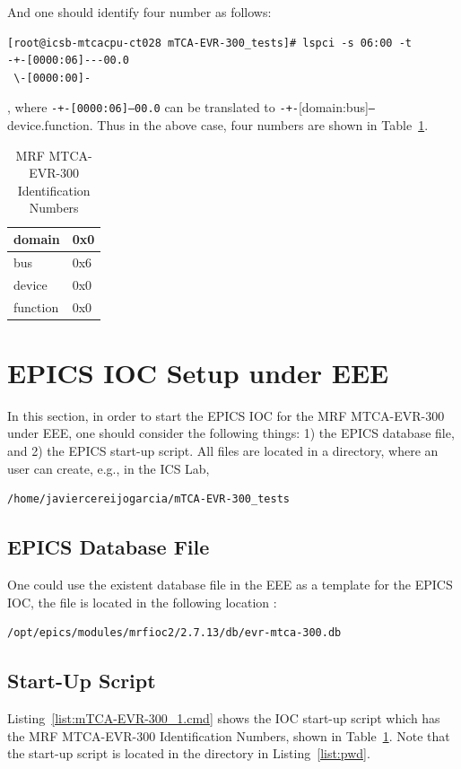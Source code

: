\documentclass[11pt
  , a4paper
  , article
  , oneside
  , showtrims
]{memoir}
\begin{document}
And one should identify four number as follows:
\begin{lstlisting}[style=termstyle]
[root@icsb-mtcacpu-ct028 mTCA-EVR-300_tests]# lspci -s 06:00 -t
-+-[0000:06]---00.0
 \-[0000:00]-
\end{lstlisting}
, where \texttt{-+-[0000:06]---00.0} can be translated to \texttt{-+-}[domain:bus]\texttt{---}device.function. Thus in the above case, four numbers are shown in Table~\ref{table:pciidnumber}.\begin{table}[!htb]
  \centering
  \begin{tabular}{l|l}
    \toprule
    domain   & 0x0 \\\midrule
    bus      & 0x6 \\\midrule
    device   & 0x0 \\\midrule
    function & 0x0 \\\bottomrule
  \end{tabular}
  \caption[]{MRF MTCA-EVR-300 Identification Numbers}
  \label{table:pciidnumber}
\end{table}


\clearpage
\section{EPICS IOC Setup under EEE}
In this section, in order to start the EPICS IOC for the MRF MTCA-EVR-300 under EEE, one should consider the following things: 1) the EPICS database file, and 2) the EPICS start-up script. All files are located in a directory, where an user can create, e.g., in the ICS Lab, 
\begin{lstlisting}[style=termstyle, label={list:pwd}, caption={Working Directory in the ICS lab.} ]
/home/javiercereijogarcia/mTCA-EVR-300_tests
\end{lstlisting}

\subsection{EPICS Database File}
One could use the existent database file in the EEE as a template for the EPICS IOC, the file is located in the following location : 
\begin{lstlisting}[style=termstyle]
/opt/epics/modules/mrfioc2/2.7.13/db/evr-mtca-300.db
\end{lstlisting} 


\subsection{Start-Up Script}
Listing~\ref{list:mTCA-EVR-300_1.cmd} shows the IOC start-up script which has the MRF MTCA-EVR-300 Identification Numbers, shown in Table~\ref{table:pciidnumber}. Note that the start-up script is located in the directory in Listing~\ref{list:pwd}.
\end{document}
